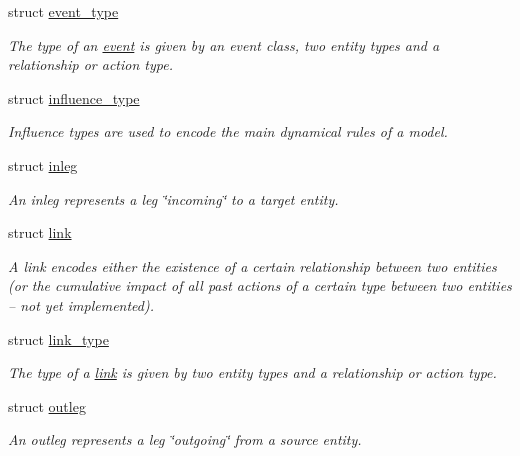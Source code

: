 \begin{DoxyCompactItemize}
struct \hyperlink{structtricl_1_1event__type}{event\+\_\+type}
\begin{DoxyCompactList}\small\item\em The type of an \hyperlink{structtricl_1_1event}{event} is given by an event class, two entity types and a relationship or action type. \end{DoxyCompactList}\item 
struct \hyperlink{structtricl_1_1influence__type}{influence\+\_\+type}
\begin{DoxyCompactList}\small\item\em Influence types are used to encode the main dynamical rules of a model. \end{DoxyCompactList}\item 
struct \hyperlink{structtricl_1_1inleg}{inleg}
\begin{DoxyCompactList}\small\item\em An inleg represents a leg \char`\"{}incoming\char`\"{} to a target entity. \end{DoxyCompactList}\item 
struct \hyperlink{structtricl_1_1link}{link}
\begin{DoxyCompactList}\small\item\em A link encodes either the existence of a certain relationship between two entities (or the cumulative impact of all past actions of a certain type between two entities -- not yet implemented). \end{DoxyCompactList}\item 
struct \hyperlink{structtricl_1_1link__type}{link\+\_\+type}
\begin{DoxyCompactList}\small\item\em The type of a \hyperlink{structtricl_1_1link}{link} is given by two entity types and a relationship or action type. \end{DoxyCompactList}\item 
struct \hyperlink{structtricl_1_1outleg}{outleg}
\begin{DoxyCompactList}\small\item\em An outleg represents a leg \char`\"{}outgoing\char`\"{} from a source entity. \end{DoxyCompactList}\end{DoxyCompactItemize}
